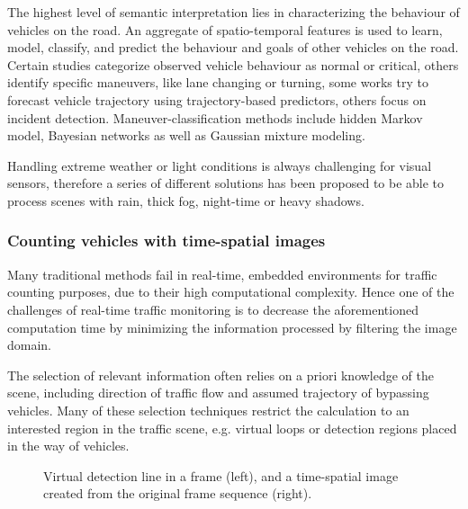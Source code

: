 The highest level of semantic interpretation lies in characterizing the behaviour of vehicles on the road\cite{Sivaraman2013}.
An aggregate of spatio-temporal features is used to learn, model, classify, and predict the behaviour and goals of other vehicles on the road.
Certain studies categorize observed vehicle behaviour as normal or critical\cite{Cherng2009}, others identify specific maneuvers, like lane changing or turning\cite{Garcia2012}, some works try to forecast vehicle trajectory using trajectory-based predictors\cite{Hermes2009}, others focus on incident detection\cite{Kamijo2004}.
Maneuver-classification methods include hidden Markov model\cite{Sivaraman2011}, Bayesian networks\cite{Kasper2012} as well as Gaussian mixture modeling\cite{Wiest2012}.

Handling extreme weather or light conditions is always challenging for visual sensors, therefore a series of different solutions has been proposed to be able to process scenes with rain\cite{Yu2015,Barnum2010}, thick fog\cite{Zhou2014a,Tarel2009}, night-time\cite{Bi2009, Robert2009} or heavy shadows\cite{Kamkar2016, Miller2015}.

\subsubsection{Counting vehicles with time-spatial images}
Many traditional methods fail in real-time, embedded environments for traffic counting purposes, due to their high computational complexity.
Hence one of the challenges of real-time traffic monitoring is to decrease the aforementioned computation time by minimizing the information processed by filtering the image domain.

The selection of relevant information often relies on a priori knowledge of the scene, including direction of traffic flow and assumed trajectory of bypassing vehicles.
Many of these selection techniques restrict the calculation to an interested region in the traffic scene, e.g. virtual loops\cite{Tursun2013a, He2008} or detection regions\cite{Miller2015, Engel2016} placed in the way of vehicles.

\begin{figure}[!h]
	\centering
	
	\caption{Virtual detection line in a frame (left), and a time-spatial image created from the original frame sequence (right).\label{fig:TSI}}
\end{figure}

